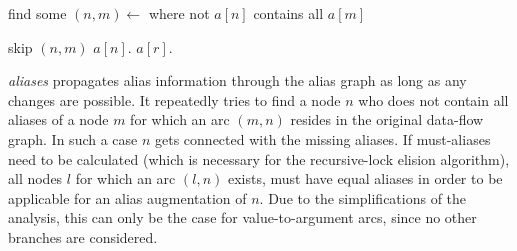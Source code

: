 \begin{algorithmic}
 
  \State {} 
\EndFor
\Repeat
  \State find some $(n, m) \gets$  where not $a[n]$ contains all $a[m]$

    \State skip $(n, m)$
  \Else
    \State $a[n]$.
        \State $a[r]$.
      \EndFor
    \EndIf
  \EndIf

\EndFunction
\end{algorithmic}
\textit{aliases} propagates alias information through the alias graph as long as any changes are possible. It repeatedly tries to find a node $n$ who does not contain all aliases of a node $m$ for which an arc $(m, n)$ resides in the original data-flow graph. In such a case $n$ gets connected with the missing aliases. If must-aliases need to be calculated (which is necessary for the recursive-lock elision algorithm), all nodes $l$ for which an arc $(l, n)$ exists, must have equal aliases in order to be applicable for an alias augmentation of $n$. Due to the simplifications of the analysis, this can only be the case for value-to-argument arcs, since no other branches are considered. 

